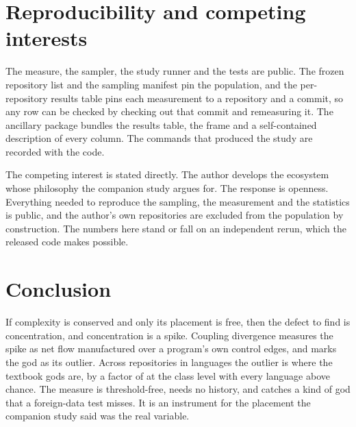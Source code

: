\documentclass[11pt,a4paper]{article}
\begin{document}
\section{Reproducibility and competing interests}\label{sec:repro}
The measure, the sampler, the study runner and the tests are public. The frozen
repository list and the sampling manifest pin the population, and the
per-repository results table pins each measurement to a repository and a commit, so
any row can be checked by checking out that commit and remeasuring it. The ancillary
package bundles the results table, the frame and a self-contained description of
every column. The commands that produced the study are recorded with the code.

The competing interest is stated directly. The author develops the ecosystem whose
philosophy the companion study argues for. The response is openness. Everything
needed to reproduce the sampling, the measurement and the statistics is public, and
the author's own repositories are excluded from the population by construction. The
numbers here stand or fall on an independent rerun, which the released code makes
possible.

\section{Conclusion}
If complexity is conserved and only its placement is free, then the defect to find
is concentration, and concentration is a spike. Coupling divergence measures the
spike as net flow manufactured over a program's own control edges, and marks the
god as its outlier. Across \nMeasured{} repositories in \nLangs{} languages the
outlier is where the textbook gods are, by a factor of \classLift{} at the class
level with every language above chance. The measure is threshold-free, needs no
history, and catches a kind of god that a foreign-data test misses. It is an
instrument for the placement the companion study said was the real variable.
\end{document}
